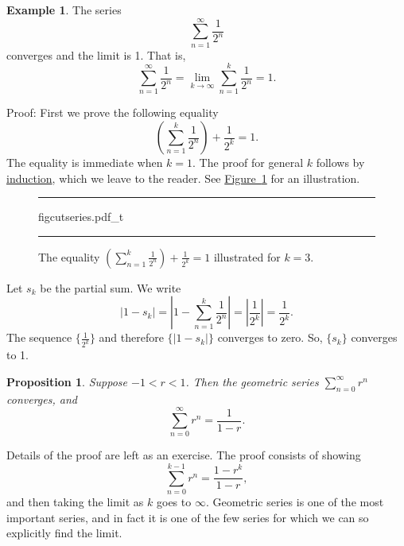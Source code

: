 \documentclass[12pt]{book}
\newenvironment{myfigureht}{%
\begin{figure}[h!t]
\noindent\rule{\textwidth}{0.4pt}\vspace{12pt}\par\centering}%
{\par\noindent\rule{\textwidth}{0.4pt}
\end{figure}}
\newcommand{\abs}[1]{\left\lvert {#1} \right\rvert}
\newcommand{\myindex}[1]{#1\index{#1}}
\theoremstyle{plain}
\newtheorem{prop}[thm]{Proposition}
\theoremstyle{remark}
\theoremstyle{definition}
\theoremstyle{exercise}
\theoremstyle{example}
\newtheorem{example}[thm]{Example}
\newcommand{\figureref}[1]{\hyperref[#1]{Figure~\ref*{#1}}}
\begin{document}
\begin{example}
The series
\begin{equation*}
\sum_{n=1}^\infty \frac{1}{2^n}
\end{equation*}
converges and the limit is 1.  That is,
\begin{equation*}
\sum_{n=1}^\infty \frac{1}{2^n} = 
\lim_{k\to\infty} \sum_{n=1}^k \frac{1}{2^n} = 
1 .
\end{equation*}

Proof: First we prove the following equality
\begin{equation*}
\left( \sum_{n=1}^k \frac{1}{2^n} \right)
+ \frac{1}{2^k}
= 1 .
\end{equation*}
The equality is immediate when $k=1$.  The proof for general $k$
follows by \hyperref[induction:thm]{induction}, which we leave to the
reader.  See \figureref{figcutseries} for an illustration.
\begin{myfigureht}
{figcutseries.pdf_t}
\caption{The equality 
$\left( \sum_{n=1}^k \frac{1}{2^n} \right)
+ \frac{1}{2^k}
= 1$ illustrated for $k=3$.\label{figcutseries}}
\end{myfigureht}

Let $s_k$ be the partial sum.  We write
\begin{equation*}
\abs{
1 - s_k 
}
=
\abs{
1 - 
\sum_{n=1}^k \frac{1}{2^n}
}
=
\abs{\frac{1}{2^k}} = 
\frac{1}{2^k} .
\end{equation*}
The sequence $\{ \frac{1}{2^k} \}$ and therefore $\{ \abs{1-s_k} \}$
converges to zero.  So, $\{ s_k \}$ converges to 1.
\end{example}

\begin{prop} \label{geometric:prop}
Suppose
$-1 < r < 1$.  Then the \emph{\myindex{geometric series}}
$\sum_{n=0}^\infty r^n$ converges, and
\begin{equation*}
\sum_{n=0}^\infty r^n = \frac{1}{1-r} .
\end{equation*}
\end{prop}

Details of the proof are left as an exercise.
The proof consists of showing 
\begin{equation*}
\sum_{n=0}^{k-1} r^n = \frac{1-r^k}{1-r} ,
\end{equation*}
and then taking the limit as $k$ goes to $\infty$.
Geometric series is one of the most important series, and in fact it is
one of the few series for which we can so explicitly find the limit.
\end{document}
